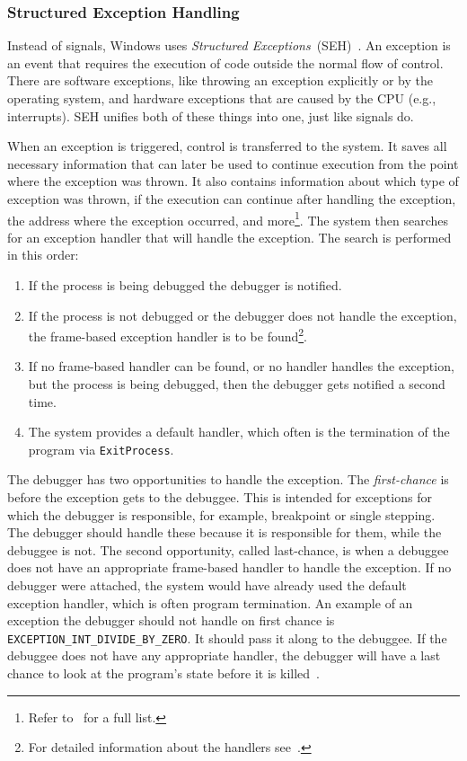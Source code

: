 \subsubsection*{Structured Exception Handling}\label{section:seh}
Instead of signals, Windows uses \textit{Structured
Exceptions}~(SEH)~\cite{windows-msdn-seh}. An exception is an event that
requires the execution of code outside the normal flow of control. There are
software exceptions, like throwing an exception explicitly or by the operating
system, and hardware exceptions that are caused by the CPU (e.g., interrupts).
SEH unifies both of these things into one, just like signals do.

When an exception is triggered, control is transferred to the system. It saves
all necessary information that can later be used to continue execution from the
point where the exception was thrown. It also contains information about which
type of exception was thrown, if the execution can continue after handling the
exception, the address where the exception occurred, and more\footnote{Refer
to~\cite{windows-msdn-seh} for a full list.}. The system then searches for an
exception handler that will handle the exception. The search is performed in
this order:

\begin{enumerate}
    \item If the process is being debugged the debugger is notified.
    \item If the process is not debugged or the debugger does not handle the
        exception, the frame-based exception handler is to be
        found\footnote{For detailed information about the handlers
        see~\cite{windows-msdn-seh}.}.
    \item If no frame-based handler can be found, or no handler handles the
        exception, but the process is being debugged, then the debugger gets
        notified a second time.
    \item The system provides a default handler, which often is the termination of
        the program via \texttt{ExitProcess}.
\end{enumerate}
The debugger has two opportunities to handle the exception. The
\textit{first-chance} is before the exception gets to the debuggee. This is
intended for exceptions for which the debugger is responsible, for example,
breakpoint or single stepping. The debugger should handle these because it is
responsible for them, while the debuggee is not. The second opportunity, called
last-chance, is when a debuggee does not have an appropriate frame-based
handler to handle the exception. If no debugger were attached, the system would
have already used the default exception handler, which is often program
termination. An example of an exception the debugger should not handle on first
chance is \verb|EXCEPTION_INT_DIVIDE_BY_ZERO|. It should pass it along to the
debuggee. If the debuggee does not have any appropriate handler, the debugger
will have a last chance to look at the program's state before it is
killed~\cite{windows-msdn-dbg-exc-handling}.

